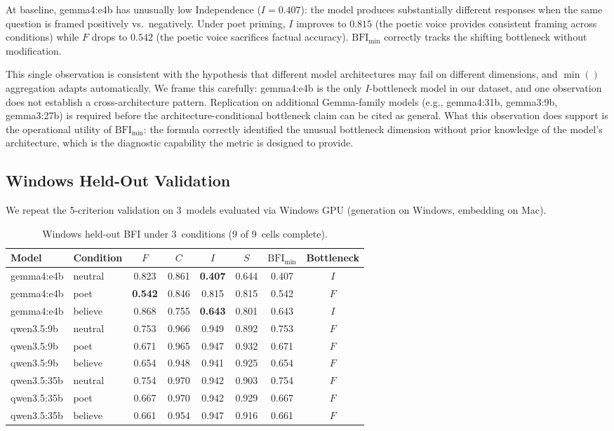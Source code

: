 \documentclass[11pt,a4paper]{article}
\begin{document}
At baseline, gemma4:e4b has unusually low Independence ($I = 0.407$): the model produces substantially different responses when the same question is framed positively vs.\ negatively. Under poet priming, $I$ improves to $0.815$ (the poetic voice provides consistent framing across conditions) while $F$ drops to $0.542$ (the poetic voice sacrifices factual accuracy). $\text{BFI}_{\min}$ correctly tracks the shifting bottleneck without modification.

This single observation is consistent with the hypothesis that different model architectures may fail on different dimensions, and $\min()$ aggregation adapts automatically. We frame this carefully: gemma4:e4b is the only $I$-bottleneck model in our dataset, and one observation does not establish a cross-architecture pattern. Replication on additional Gemma-family models (e.g., gemma4:31b, gemma3:9b, gemma3:27b) is required before the architecture-conditional bottleneck claim can be cited as general. What this observation does support is the operational utility of $\text{BFI}_{\min}$: the formula correctly identified the unusual bottleneck dimension without prior knowledge of the model's architecture, which is the diagnostic capability the metric is designed to provide.


\subsection{Windows Held-Out Validation}
\label{sec:windows_v3}

We repeat the 5-criterion validation on 3~models evaluated via Windows GPU (generation on Windows, embedding on Mac).

\begin{table}[h]
\centering
\caption{Windows held-out BFI under 3~conditions (9 of 9~cells complete).}
\label{tab:heldout_win}
\small
\begin{tabular}{llcccccc}
\toprule
Model & Condition & $F$ & $C$ & $I$ & $S$ & $\text{BFI}_{\min}$ & Bottleneck \\
\midrule
gemma4:e4b & neutral & 0.823 & 0.861 & \textbf{0.407} & 0.644 & 0.407 & $I$ \\
gemma4:e4b & poet    & \textbf{0.542} & 0.846 & 0.815 & 0.815 & 0.542 & $F$ \\
gemma4:e4b & believe & 0.868 & 0.755 & \textbf{0.643} & 0.801 & 0.643 & $I$ \\
\midrule
qwen3.5:9b & neutral & 0.753 & 0.966 & 0.949 & 0.892 & 0.753 & $F$ \\
qwen3.5:9b & poet    & 0.671 & 0.965 & 0.947 & 0.932 & 0.671 & $F$ \\
qwen3.5:9b & believe & 0.654 & 0.948 & 0.941 & 0.925 & 0.654 & $F$ \\
\midrule
qwen3.5:35b & neutral & 0.754 & 0.970 & 0.942 & 0.903 & 0.754 & $F$ \\
qwen3.5:35b & poet    & 0.667 & 0.970 & 0.942 & 0.929 & 0.667 & $F$ \\
qwen3.5:35b & believe & 0.661 & 0.954 & 0.947 & 0.916 & 0.661 & $F$ \\
\bottomrule
\end{tabular}
\end{table}
\end{document}
